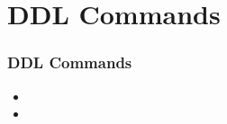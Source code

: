 \section{ DDL Commands}

\begin{frame}
	\frametitle{ DDL Commands}
	
	\begin{itemize}
	
	    \item
	
	    \item
	
	\end{itemize}
	
\end{frame}